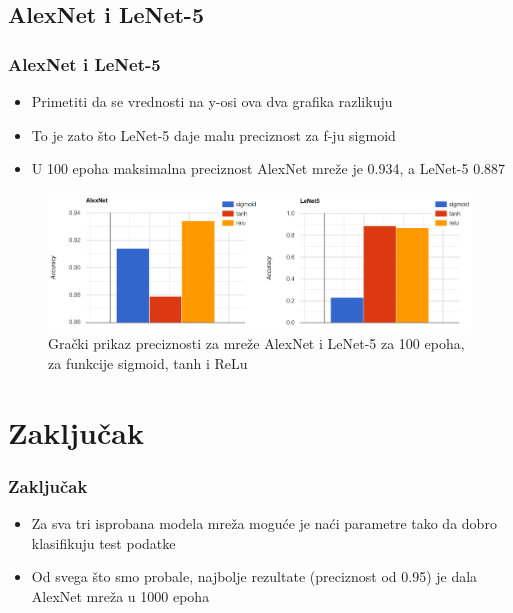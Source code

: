 \documentclass{beamer}
\begin{document}
\subsection{AlexNet i LeNet-5}
\begin{frame}
\frametitle{AlexNet i LeNet-5}

\begin{itemize}
\item Primetiti da se vrednosti na y-osi ova dva grafika razlikuju
\item To je zato što LeNet-5 daje malu preciznost za f-ju sigmoid
\item U 100 epoha maksimalna preciznost AlexNet mreže je 0.934, a LeNet-5 0.887

\end{itemize}

\begin{figure}
\includegraphics[scale=0.45]{graphs_alexnet_lenet.png}
\caption{Grački prikaz preciznosti za mreže AlexNet i LeNet-5 za 100 epoha, za funkcije sigmoid, tanh i ReLu}
\end{figure}

\end{frame}








\section{Zaključak}

\begin{frame}
\frametitle{Zaključak}

\begin{itemize}
\item Za sva tri isprobana modela mreža moguće je naći parametre tako da dobro klasifikuju test podatke 
\item Od svega što smo probale, najbolje rezultate (preciznost od 0.95) je dala AlexNet mreža u 1000 epoha
\end{itemize}

\end{frame}
\end{document}
